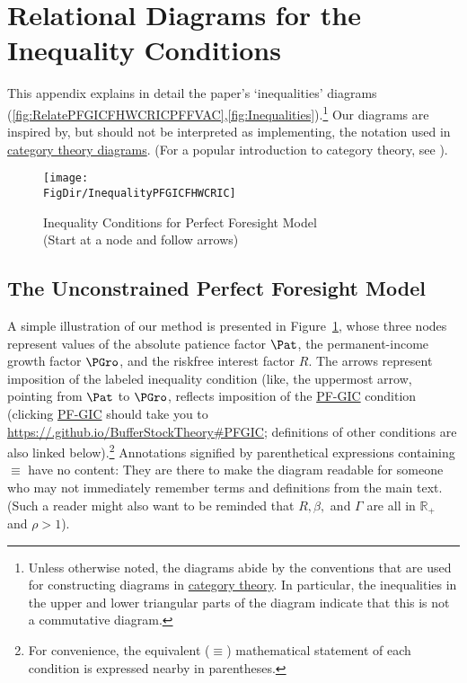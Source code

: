 \documentclass[\econtexRoot/BufferStockTheory]{subfiles}
\newcommand{\BSTlinkTo}{https://\owner.github.io/BufferStockTheory}
\newcommand{\PFGICFull}{\href{{\BSTlinkTo}\#PFGIC}{{\BSTlinkTo}\#PFGIC}}
\renewcommand{\PFGIC}{\href{{\BSTlinkTo}\#PFGIC}{\textrm{PF-GIC}}}
\begin{document}
\label{sec:ApndxConditionDiagrams}
\hypertarget{ApndxConditionDiagrams}{}
\section{Relational Diagrams for the Inequality Conditions}

This appendix explains in detail the paper's `inequalities' diagrams (\ref{fig:RelatePFGICFHWCRICPFFVAC},\ref{fig:Inequalities}).\footnote{Unless otherwise noted, the diagrams abide by the conventions that are used for constructing diagrams in \href{https://en.wikipedia.org/wiki/Diagram_(category_theory)}{category theory}.  In particular, the inequalities in the upper and lower triangular parts of the diagram indicate that this is not a commutative diagram.}  Our diagrams are inspired by, but should not be interpreted as implementing, the notation used in \href{https://en.wikipedia.org/wiki/Diagram_(category_theory)}{category theory diagrams}.  (For a popular introduction to category theory, see \cite{riehl2017category}).

\hypertarget{InequalityPFGICFHWCRIC}{}
\begin{figure}
\centering
\texttt{[image: \\FigDir/InequalityPFGICFHWCRIC]}
\caption{Inequality Conditions for Perfect Foresight Model \\ (Start at a node and follow arrows)}
\label{fig:InequalityPFGICFHWCRIC}
\end{figure}

\subsection{The Unconstrained Perfect Foresight Model}

A simple illustration of our method is presented in Figure~\ref{fig:InequalityPFGICFHWCRIC}, whose three nodes represent values of the absolute patience factor $\Pat$, the permanent-income growth factor $\PGro$, and the riskfree interest factor ${R}$.  The arrows represent imposition of the labeled inequality condition  (like,  the uppermost arrow, pointing from {$\Pat$} to $\PGro$, reflects imposition of the {\PFGIC} condition (clicking {\PFGIC} should take you to {\PFGICFull}; definitions of other conditions are also linked below).\footnote{For convenience, the equivalent ($\equiv$) mathematical statement of each condition is expressed nearby in parentheses.}  Annotations signified by parenthetical expressions containing $\equiv$ have no content: They are there to make the diagram readable for someone who may not immediately remember terms and definitions from the main text.  (Such a reader might also want to be reminded that ${R}, {\beta}, $ and $\Gamma$ are all in $\mathbb{R}_{+}$ and ${\rho}>1$).
\end{document}
